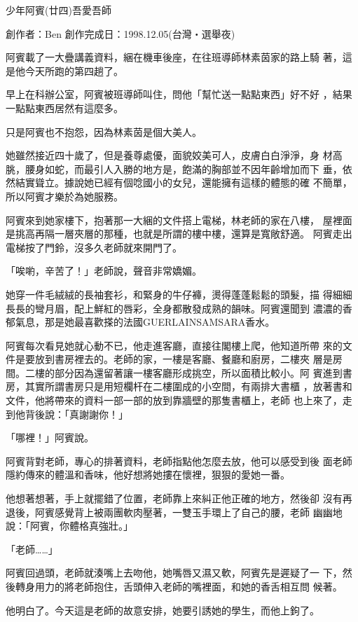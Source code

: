 



少年阿賓(廿四)吾愛吾師

創作者：Ben
創作完成日：1998.12.05(台灣‧選舉夜)


阿賓載了一大疊講義資料，綑在機車後座，在往班導師林素茵家的路上騎
著，這是他今天所跑的第四趟了。

早上在科辦公室，阿賓被班導師叫住，問他「幫忙送一點點東西」好不好
，結果一點點東西居然有這麼多。

只是阿賓也不抱怨，因為林素茵是個大美人。

她雖然接近四十歲了，但是養尊處優，面貌姣美可人，皮膚白白淨淨，身
材高朓，腰身如蛇，而最引人入勝的地方是，飽滿的胸部並不因年齡增加而下
垂，依然結實聳立。據說她已經有個唸國小的女兒，還能擁有這樣的體態的確
不簡單，所以阿賓才樂於為她服務。

阿賓來到她家樓下，抱著那一大綑的文件搭上電梯，林老師的家在八樓，
屋裡面是挑高再隔一層夾層的那種，也就是所謂的樓中樓，還算是寬敞舒適。
阿賓走出電梯按了門鈴，沒多久老師就來開門了。

「唉喲，辛苦了！」老師說，聲音非常嬌媚。

她穿一件毛絨絨的長袖套衫，和緊身的牛仔褲，燙得蓬蓬鬆鬆的頭髮，描
得細細長長的彎月眉，配上鮮紅的唇彩，全身都散發成熟的韻味。阿賓還聞到
濃濃的香郁氣息，那是她最喜歡搽的法國GUERLAINSAMSARA香水。

阿賓每次看見她就心動不已，他走進客廳，直接往閣樓上爬，他知道所帶
來的文件是要放到書房裡去的。老師的家，一樓是客廳、餐廳和廚房，二樓夾
層是房間。二樓的部分因為還留著讓一樓客廳形成挑空，所以面積比較小。阿
賓進到書房，其實所謂書房只是用短欄杆在二樓圍成的小空間，有兩排大書櫃
，放著書和文件，他將帶來的資料一部一部的放到靠牆壁的那隻書櫃上，老師
也上來了，走到他背後說：「真謝謝你！」

「哪裡！」阿賓說。

阿賓背對老師，專心的排著資料，老師指點他怎麼去放，他可以感受到後
面老師隱約傳來的體溫和香味，他好想將她摟在懷裡，狠狠的愛她一番。

他想著想著，手上就擺錯了位置，老師靠上來糾正他正確的地方，然後卻
沒有再退後，阿賓感覺背上被兩團軟肉壓著，一雙玉手環上了自己的腰，老師
幽幽地說：「阿賓，你體格真強壯。」

「老師……」

阿賓回過頭，老師就湊嘴上去吻他，她嘴唇又濕又軟，阿賓先是遲疑了一
下，然後轉身用力的將老師抱住，舌頭伸入老師的嘴裡面，和她的香舌相互問
候著。

他明白了。今天這是老師的故意安排，她要引誘她的學生，而他上鉤了。

